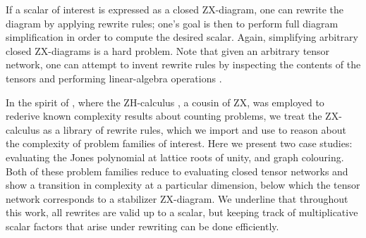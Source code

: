 If a scalar of interest is expressed as a closed ZX-diagram,
one can rewrite the diagram by applying rewrite rules; one's goal is then to perform full diagram simplification in order to compute the desired scalar.
Again, simplifying arbitrary closed ZX-diagrams is a hard problem.
Note that
given an arbitrary tensor network, one can attempt to invent rewrite rules by inspecting the contents of the tensors and performing linear-algebra operations \cite{gray2020hyperoptimized}.



In the spirit of \cite{debeaudrap2020tensor},
where the ZH-calculus \cite{backens2018zh}, a cousin of ZX, was employed to rederive known complexity results about counting problems, we treat the ZX-calculus as a library of rewrite rules, which we import and use to reason about the complexity of problem families of interest.
Here we present two case studies: evaluating the Jones polynomial at lattice roots of unity, and graph colouring.
Both of these problem families reduce to evaluating
closed tensor networks and show a transition in complexity
at a particular dimension, below which the tensor network corresponds to a stabilizer ZX-diagram.
We underline that throughout this work, all rewrites are valid
up to a scalar, but keeping track of multiplicative scalar factors that arise under rewriting can be done efficiently.
